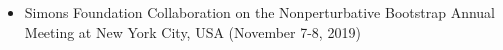 
\begin{itemize}
  \item  Simons Foundation Collaboration on the Nonperturbative Bootstrap Annual Meeting at New York City, USA
  (November 7-8, 2019) \hfill  \end{itemize}